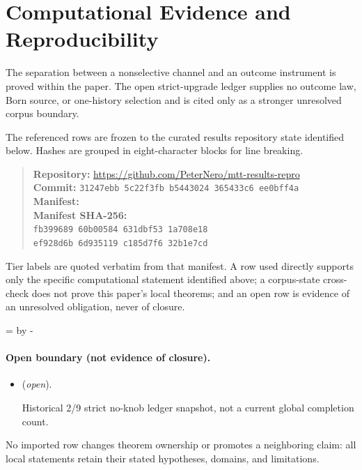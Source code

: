 \documentclass[11pt]{article}
\begin{document}
\section*{Computational Evidence and Reproducibility}
The separation between a nonselective channel and an outcome instrument is proved within the paper. The open strict-upgrade ledger supplies no outcome law, Born source, or one-history selection and is cited only as a stronger unresolved corpus boundary.

The referenced rows are frozen to the curated results repository state identified below. Hashes are grouped in eight-character blocks for line breaking.
\begin{quote}\small
\textbf{Repository:} \url{https://github.com/PeterNero/mtt-results-repro}\\
\textbf{Commit:} \texttt{31247ebb 5c22f3fb b5443024 365433c6 ee0bff4a}\\
\textbf{Manifest:} \\
\textbf{Manifest SHA-256:}\\
\texttt{fb399689 60b00584 631dbf53 1a708e18}\\
\texttt{ef928d6b 6d935119 c185d7f6 32b1e7cd}
\end{quote}

Tier labels are quoted verbatim from that manifest. A row used directly supports only the specific computational statement identified above; a corpus-state cross-check does not prove this paper's local theorems; and an open row is evidence of an unresolved obligation, never of closure.

\par\begingroup{}=\pagegoal\advance{} by -\pagetotal\ifdim\dimen0<7\baselineskip\newpage\fi\endgroup
\paragraph{Open boundary (not evidence of closure).}
\begin{itemize}
\setlength{\itemsep}{0.25em}
\item {} (\emph{open}).\par Historical 2/9
strict no-knob ledger snapshot, not a current global completion count.
\end{itemize}

No imported row changes theorem ownership or promotes a neighboring claim: all local statements retain their stated hypotheses, domains, and limitations.
\end{document}
